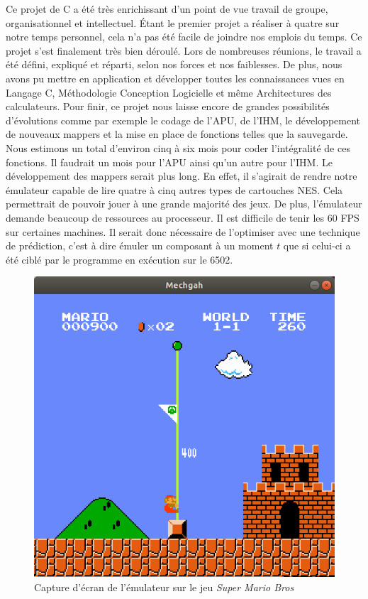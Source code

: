 Ce projet de C a été très enrichissant d'un point de vue travail de groupe, organisationnel et intellectuel. Étant le premier projet a réaliser à quatre sur notre temps personnel, cela n'a pas été facile de joindre nos emplois du temps. Ce projet s'est finalement très bien déroulé. Lors de nombreuses réunions, le travail a été défini, expliqué et réparti, selon nos forces et nos faiblesses. De plus, nous avons pu mettre en application et développer toutes les connaissances vues en Langage C, Méthodologie Conception Logicielle et même Architectures des calculateurs. Pour finir, ce projet nous laisse encore de grandes possibilités d'évolutions comme par exemple le codage de l'APU, de l'IHM, le développement de nouveaux mappers et la mise en place de fonctions telles que la sauvegarde. Nous estimons un total d'environ cinq à six mois pour coder l'intégralité de ces fonctions. Il faudrait un mois pour l'APU ainsi qu'un autre pour l'IHM. Le développement des mappers serait plus long. En effet, il s'agirait de rendre notre émulateur capable de lire quatre à cinq autres types de cartouches NES. Cela permettrait de pouvoir jouer à une grande majorité des jeux. De plus, l'émulateur demande beaucoup de ressources au processeur. Il est difficile de tenir les 60 FPS sur certaines machines. Il serait donc nécessaire de l'optimiser avec une technique de prédiction, c'est à dire émuler un composant à un moment $t$ que si celui-ci a été ciblé par le programme en exécution sur le 6502.

\begin{figure}[H]
  \centering
   \includegraphics[width=0.50\linewidth]{images/smb_nes.png}
   \caption{Capture d'écran de l'émulateur sur le jeu \emph{Super Mario Bros}}
   \label{fig:gantt_fin}
\end{figure}
